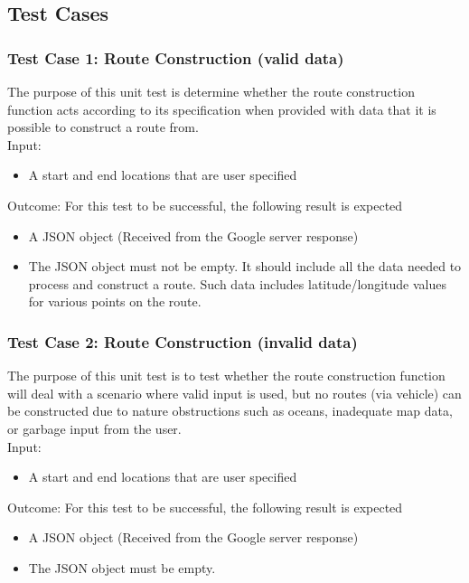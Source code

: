 \documentclass[a4paper,12pt]{article}
\begin{document}
\subsection{Test Cases}
\subsubsection{Test Case 1: Route Construction (valid data)}
The purpose of this unit test is determine whether the route construction function acts according to its specification when provided with data that it is possible to construct a route from.\\Input: \begin{itemize}
\item A start and end locations that are user specified
\end{itemize}
Outcome: For this test to be successful, the following result is expected
\begin{itemize}
\item A JSON object (Received from the Google server response)
\item The JSON object must not be empty. It should include all the data needed to process and construct a route. Such data includes latitude/longitude values for various points on the route.
\end{itemize}
\subsubsection{Test Case 2: Route Construction (invalid data)}
The purpose of this unit test is to test whether the route construction function will deal with a scenario where valid input is used, but no routes (via vehicle) can be constructed due to nature obstructions such as oceans, inadequate map data, or garbage input from the user.
\\Input: \begin{itemize}
\item A start and end locations that are user specified
\end{itemize}
Outcome: For this test to be successful, the following result is expected
\begin{itemize}
\item A JSON object (Received from the Google server response)
\item The JSON object must be empty.
\end{itemize}
\end{document}

